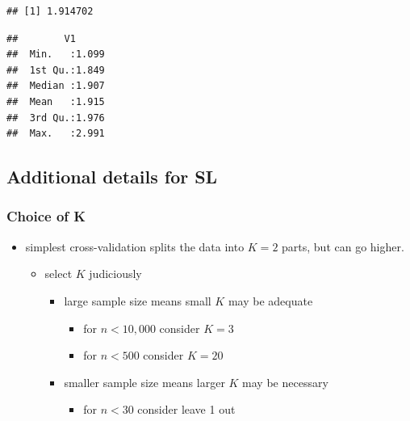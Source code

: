 \documentclass[
]{book}
\newenvironment{Shaded}{\begin{snugshade}}{\end{snugshade}}
\newcommand{\FunctionTok}[1]{\textcolor[rgb]{0.00,0.00,0.00}{#1}}
\newcommand{\NormalTok}[1]{#1}
\newcommand{\SpecialCharTok}[1]{\textcolor[rgb]{0.00,0.00,0.00}{#1}}
\providecommand{\tightlist}{%
  \setlength{\itemsep}{0pt}\setlength{\parskip}{0pt}}
\begin{document}
\begin{verbatim}
## [1] 1.914702
\end{verbatim}

\begin{Shaded}
\end{Shaded}

\begin{verbatim}
##        V1       
##  Min.   :1.099  
##  1st Qu.:1.849  
##  Median :1.907  
##  Mean   :1.915  
##  3rd Qu.:1.976  
##  Max.   :2.991
\end{verbatim}

\hypertarget{additional-details-for-sl}{%
\subsection{Additional details for SL}\label{additional-details-for-sl}}

\hypertarget{choice-of-k}{%
\subsubsection{Choice of K}\label{choice-of-k}}

\begin{itemize}
\tightlist
\item
  simplest cross-validation splits the data into \(K=2\) parts, but can go higher.

  \begin{itemize}
  \tightlist
  \item
    select \(K\) judiciously

    \begin{itemize}
    \tightlist
    \item
      large sample size means small \(K\) may be adequate

      \begin{itemize}
      \tightlist
      \item
        for \(n \lt 10,000\) consider \(K=3\)
      \item
        for \(n \lt 500\) consider \(K=20\)
      \end{itemize}
    \item
      smaller sample size means larger \(K\) may be necessary

      \begin{itemize}
      \tightlist
      \item
        for \(n \lt 30\) consider leave 1 out
      \end{itemize}
    \end{itemize}
  \end{itemize}
\end{itemize}
\end{document}
